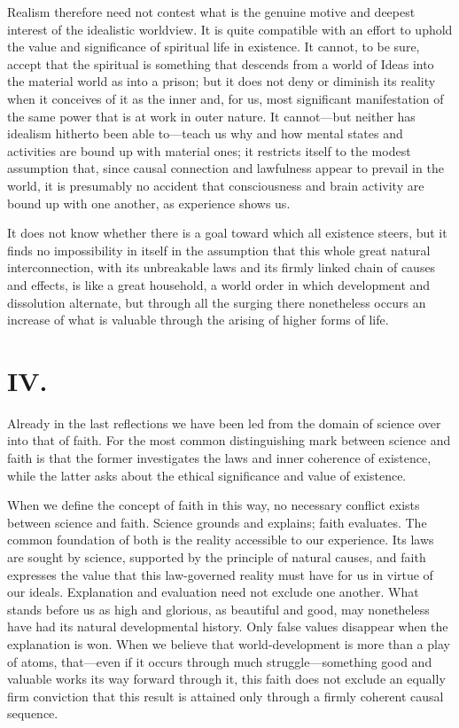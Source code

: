 \documentclass[12pt,a4paper]{article}
\begin{document}
Realism therefore need not contest what is the genuine motive and deepest
interest of the idealistic worldview. It is quite compatible with an
effort to uphold the value and significance of spiritual life in existence.
It cannot, to be sure, accept that the spiritual is something that descends
from a world of Ideas into the material world as into a prison; but it
does not deny or diminish its reality when it conceives of it as the inner
and, for us, most significant manifestation of the same power that is at
work in outer nature. It cannot---but neither has idealism hitherto been
able to---teach us why and how mental states and activities are bound up
with material ones; it restricts itself to the modest assumption that,
since causal connection and lawfulness appear to prevail in the world, it
is presumably no accident that consciousness and brain activity are bound
up with one another, as experience shows us.

It does not know whether there is a goal toward which all existence steers,
but it finds no impossibility in itself in the assumption that this whole
great natural interconnection, with its unbreakable laws and its firmly
linked chain of causes and effects, is like a great household, a world
order in which development and dissolution alternate, but through all the
surging there nonetheless occurs an increase of what is valuable through
the arising of higher forms of life.

\section*{IV.}

Already in the last reflections we have been led from the domain of science
over into that of faith. For the most common distinguishing mark between
science and faith is that the former investigates the laws and inner
coherence of existence, while the latter asks about the ethical
significance and value of existence.

When we define the concept of faith in this way, no necessary conflict
exists between science and faith. Science grounds and explains; faith
evaluates. The common foundation of both is the reality accessible to our
experience. Its laws are sought by science, supported by the principle of
natural causes, and faith expresses the value that this law-governed
reality must have for us in virtue of our ideals. Explanation and
evaluation need not exclude one another. What stands before us as high and
glorious, as beautiful and good, may nonetheless have had its natural
developmental history. Only false values disappear when the explanation
is won. When we believe that world-development is more than a play of
atoms, that---even if it occurs through much struggle---something good and
valuable works its way forward through it, this faith does not exclude an
equally firm conviction that this result is attained only through a firmly
coherent causal sequence.
\end{document}
